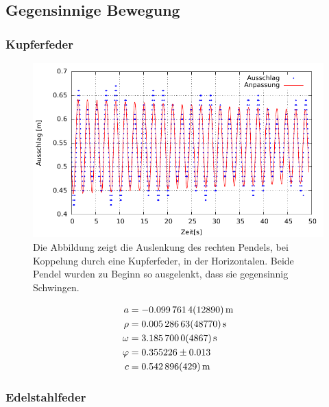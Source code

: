 \subsection{Gegensinnige Bewegung}




\subsubsection*{Kupferfeder}


\begin{figure}[h!]
	\centering
	\includegraphics[width=0.7\linewidth]{Auswertung/kupfer/gegen/1/kupfergegA}
	\caption{Die Abbildung zeigt die Auslenkung des rechten Pendels, bei Koppelung durch eine Kupferfeder, in der Horizontalen. Beide Pendel wurden zu Beginn so ausgelenkt, dass sie gegensinnig Schwingen.}
	\label{fig:kupfergega}
\end{figure}


\begin{align*}
a               &=\SI{  -0.0997614      \pm 0.001289 }{m}    \\
\rho              &=\SI{  0.00528663      \pm 0.0004877 }{\per s}    \\
\omega              &=\SI{  3.1857          \pm 0.0004867 }{\per s}   \\
\varphi               &=  0.355226        \pm 0.013       \\
c              &=\SI{  0.542896        \pm 0.000429  }{m}    \\
\end{align*}



\subsubsection*{Edelstahlfeder}




